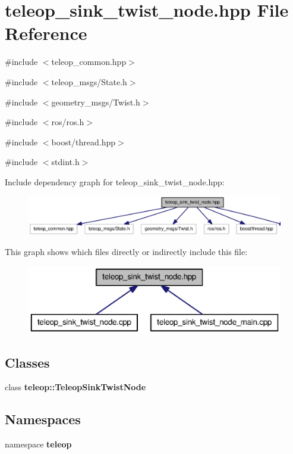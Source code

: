 \section{teleop\_\-sink\_\-twist\_\-node.hpp File Reference}
\label{teleop__sink__twist__node_8hpp}
{\ttfamily \#include $<$teleop\_\-common.hpp$>$}\par
{\ttfamily \#include $<$teleop\_\-msgs/State.h$>$}\par
{\ttfamily \#include $<$geometry\_\-msgs/Twist.h$>$}\par
{\ttfamily \#include $<$ros/ros.h$>$}\par
{\ttfamily \#include $<$boost/thread.hpp$>$}\par
{\ttfamily \#include $<$stdint.h$>$}\par
Include dependency graph for teleop\_\-sink\_\-twist\_\-node.hpp:
\nopagebreak
\begin{figure}[H]
\begin{center}
\leavevmode
\includegraphics[width=400pt]{teleop__sink__twist__node_8hpp__incl}
\end{center}
\end{figure}
This graph shows which files directly or indirectly include this file:
\nopagebreak
\begin{figure}[H]
\begin{center}
\leavevmode
\includegraphics[width=362pt]{teleop__sink__twist__node_8hpp__dep__incl}
\end{center}
\end{figure}
\subsection*{Classes}
\begin{DoxyCompactItemize}
\item 
class {\bf teleop::TeleopSinkTwistNode}
\end{DoxyCompactItemize}
\subsection*{Namespaces}
\begin{DoxyCompactItemize}
\item 
namespace {\bf teleop}
\end{DoxyCompactItemize}
